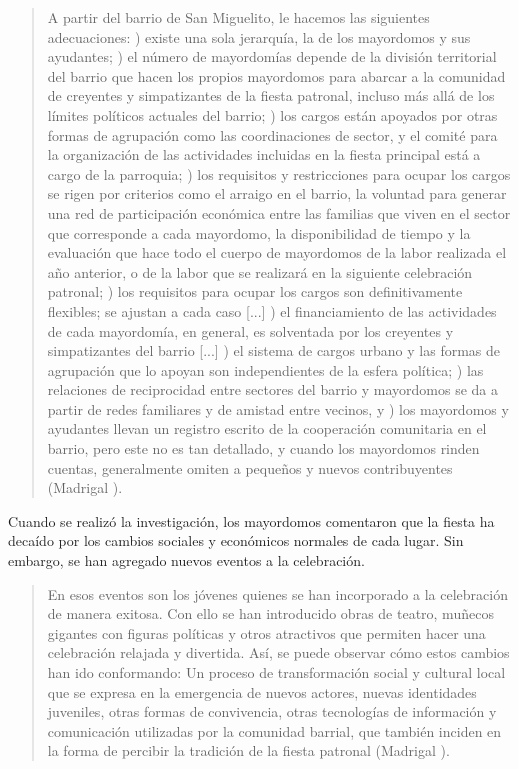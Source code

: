 \documentclass[14pt,letterpaper,twoside]{extbook} %
\begin{document}
\begin{quotation}
\noindent A partir del barrio de San Miguelito, le hacemos las siguientes adecuaciones: ) existe una sola jerarquía, la de los mayordomos y sus ayudantes; ) el número de mayordomías depende de la división territorial del barrio que hacen los propios mayordomos para abarcar a la comunidad de creyentes y simpatizantes de la fiesta patronal, incluso más allá de los límites políticos actuales del barrio; ) los cargos están apoyados por otras formas de agrupación como las coordinaciones de sector, y el comité para la organización de las actividades incluidas en la fiesta principal está a cargo de la parroquia; ) los requisitos y restricciones para ocupar los cargos se rigen por criterios como el arraigo en el barrio, la voluntad para generar una red de participación económica entre las familias que viven en el sector que corresponde a cada mayordomo, la disponibilidad de tiempo y la evaluación que hace todo el cuerpo de mayordomos de la labor realizada el año anterior, o de la labor que se realizará en la siguiente celebración patronal; ) los requisitos para ocupar los cargos son definitivamente flexibles; se ajustan a cada caso [...] ) el financiamiento de las actividades de cada mayordomía, en general, es solventada por los creyentes y simpatizantes del barrio [...] ) el sistema de cargos urbano y las formas de agrupación que lo apoyan son independientes de la esfera política; ) las relaciones de reciprocidad entre sectores del barrio y mayordomos se da a partir de redes familiares y de amistad entre vecinos, y ) los mayordomos y ayudantes llevan un registro escrito de la cooperación comunitaria en el barrio, pero este no es tan detallado, y cuando los mayordomos rinden cuentas, generalmente omiten a pequeños y nuevos contribuyentes (Madrigal ).
\end{quotation}

\noindent Cuando se realizó la investigación, los mayordomos comentaron que la fiesta ha decaído por los cambios sociales y económicos normales de cada lugar. Sin embargo, se han agregado nuevos eventos a la celebración.

\begin{quotation}
\noindent En esos eventos son los jóvenes quienes se han incorporado a la celebración de manera exitosa. Con ello se han introducido obras de teatro, muñecos gigantes con figuras políticas y otros atractivos que permiten hacer una celebración relajada y divertida. Así, se puede observar cómo estos cambios han ido conformando: Un proceso de transformación social y cultural local que se expresa en la emergencia de nuevos actores, nuevas identidades juveniles, otras formas de convivencia, otras tecnologías de información y comunicación utilizadas por la comunidad barrial, que también inciden en la forma de percibir la tradición de la fiesta patronal (Madrigal ).
\end{quotation}
\end{document}
